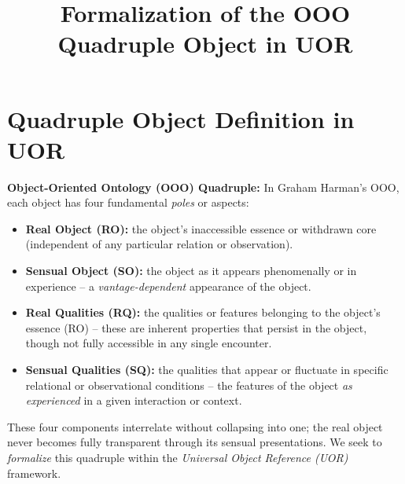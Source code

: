 \documentclass[12pt]{article}
\begin{document}
\title{Formalization of the OOO Quadruple Object in UOR}
\author{}
\date{}
\maketitle

\section{Quadruple Object Definition in UOR}

\textbf{Object-Oriented Ontology (OOO) Quadruple:} In Graham Harman's OOO, each object has four fundamental \emph{poles} or aspects:
\begin{itemize}
    \item \textbf{Real Object (RO):} the object’s inaccessible essence or withdrawn core (independent of any particular relation or observation).
    \item \textbf{Sensual Object (SO):} the object as it appears phenomenally or in experience -- a \emph{vantage-dependent} appearance of the object.
    \item \textbf{Real Qualities (RQ):} the qualities or features belonging to the object’s essence (RO) -- these are inherent properties that persist in the object, though not fully accessible in any single encounter.
    \item \textbf{Sensual Qualities (SQ):} the qualities that appear or fluctuate in specific relational or observational conditions -- the features of the object \emph{as experienced} in a given interaction or context.
\end{itemize}

These four components interrelate without collapsing into one; the real object never becomes fully transparent through its sensual presentations. We seek to \emph{formalize} this quadruple within the \emph{Universal Object Reference (UOR)} framework.

\medskip
\end{document}
